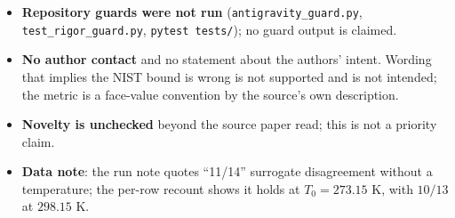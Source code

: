 \documentclass[10pt]{article}
\begin{document}
\begin{itemize}
\item \textbf{Repository guards were not run} (\texttt{antigravity\_guard.py}, \texttt{test\_rigor\_guard.py}, \texttt{pytest tests/}); no guard output is claimed.
\item \textbf{No author contact} and no statement about the authors' intent. Wording that implies the NIST bound is wrong is not supported and is not intended; the metric is a face-value convention by the source's own description.
\item \textbf{Novelty is unchecked} beyond the source paper read; this is not a priority claim.
\item \textbf{Data note}: the run note quotes ``11/14'' surrogate disagreement without a temperature; the per-row recount shows it holds at $T_0=273.15$ K, with $10/13$ at $298.15$ K.
\end{itemize}

\end{document}
